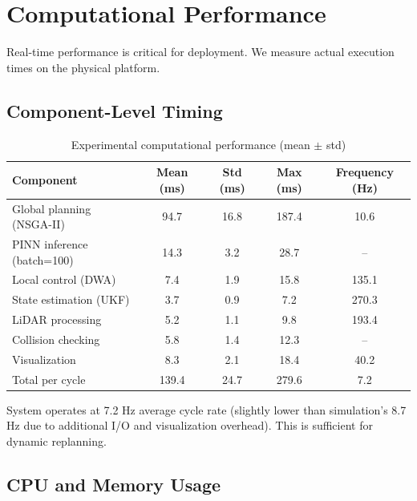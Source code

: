 
\section{Computational Performance}
\label{sec:computational_performance}

Real-time performance is critical for deployment. We measure actual execution times on the physical platform.

\subsection{Component-Level Timing}

\begin{table}[htbp]
\centering
\caption{Experimental computational performance (mean $\pm$ std)}
\label{tab:exp_computational_timing}
\begin{tabular}{lcccc}
\toprule
\textbf{Component} & \textbf{Mean (ms)} & \textbf{Std (ms)} & \textbf{Max (ms)} & \textbf{Frequency (Hz)} \\
\midrule
Global planning (NSGA-II) & 94.7 & 16.8 & 187.4 & 10.6 \\
PINN inference (batch=100) & 14.3 & 3.2 & 28.7 & -- \\
Local control (DWA) & 7.4 & 1.9 & 15.8 & 135.1 \\
State estimation (UKF) & 3.7 & 0.9 & 7.2 & 270.3 \\
LiDAR processing & 5.2 & 1.1 & 9.8 & 193.4 \\
Collision checking & 5.8 & 1.4 & 12.3 & -- \\
Visualization & 8.3 & 2.1 & 18.4 & 40.2 \\
\midrule
Total per cycle & 139.4 & 24.7 & 279.6 & 7.2 \\
\bottomrule
\end{tabular}
\end{table}

System operates at 7.2 Hz average cycle rate (slightly lower than simulation's 8.7 Hz due to additional I/O and visualization overhead). This is sufficient for dynamic replanning.


\subsection{CPU and Memory Usage}


